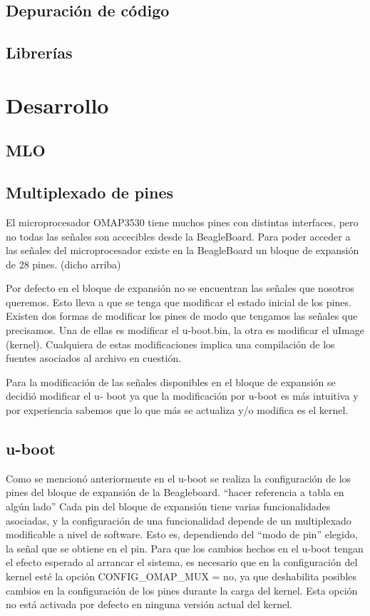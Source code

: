 \subsection{Depuración de código}
\subsection{Librerías}

\section{Desarrollo}
\subsection{MLO}
\subsection{Multiplexado de pines}
El microprocesador OMAP3530 tiene muchos pines con distintas interfaces, pero no todas las 
señales son accecibles desde la BeagleBoard. Para poder acceder a las señales del microprocesador 
existe en la BeagleBoard un bloque de expansión de 28 pines. (dicho arriba)

Por defecto en el bloque de expansión no se encuentran las señales que nosotros queremos. Esto 
lleva a que se tenga que modificar el estado inicial de los pines. 
Existen dos formas de modificar los pines de modo que tengamos las señales que precisamos. Una 
de ellas es modificar el u-boot.bin, la otra es modificar el uImage (kernel). Cualquiera de estas modificaciones implica una compilación de los fuentes asociados al archivo en cuestión. 

Para la modificación de las señales disponibles en el bloque de expansión se decidió modificar el u- 
boot ya que la modificación por u-boot es más intuitiva y por experiencia sabemos que lo que más se actualiza y/o modifica es el kernel. 

\subsection{u-boot}
Como se mencionó anteriormente en el u-boot se realiza la configuración de los pines del bloque de expansión de la Beagleboard. “hacer referencia a tabla en algún lado”
Cada pin del bloque de expansión tiene varias funcionalidades asociadas, y la configuración de una 
funcionalidad depende de un multiplexado modificable a nivel de software. Esto es, dependiendo del “modo de pin” elegido, la señal que se obtiene en el pin.
Para que los cambios hechos en el u-boot tengan el efecto esperado al arrancar el sistema, es necesario que en la configuración del kernel esté la opción CONFIG\_OMAP\_MUX = no, ya que deshabilita posibles cambios en la configuración de los pines durante la carga del kernel. Esta opción no está activada por defecto en ninguna versión actual del kernel. 


